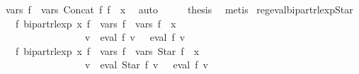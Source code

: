\begin{isabellebody}
\ {\isachardoublequoteopen}vars\ {\isacharquery}{\kern0pt}f{\isacharprime}{\kern0pt}\ {\isacharequal}{\kern0pt}\ vars\ {\isacharparenleft}{\kern0pt}Concat\ f{}\ f{}{\isacharparenright}{\kern0pt}\ {\isasymunion}\ {\isacharbraceleft}{\kern0pt}x{\isacharbraceright}{\kern0pt}{\isachardoublequoteclose}\ \isamarkupfalse%
\ auto\isanewline
\ \ \isamarkupfalse%
\ \isamarkupfalse%
\ {\isacharquery}{\kern0pt}thesis\ \isamarkupfalse%
\ metis\isanewline
{}\isamarkupfalse%
%
\endisatagproof
{\isafoldproof}%
%
\isadelimproof
\isanewline
%
\endisadelimproof
\isanewline
{}\isamarkupfalse%
\ reg{\isacharunderscore}{\kern0pt}eval{\isacharunderscore}{\kern0pt}bipart{\isacharunderscore}{\kern0pt}rlexp{\isacharunderscore}{\kern0pt}Star{\isacharcolon}{\kern0pt}\isanewline
\ \ \ {\isachardoublequoteopen}{\isasymexists}f{\isacharprime}{\kern0pt}{\isachardot}{\kern0pt}\ bipart{\isacharunderscore}{\kern0pt}rlexp\ x\ f{\isacharprime}{\kern0pt}\ {\isasymand}\ vars\ f{\isacharprime}{\kern0pt}\ {\isacharequal}{\kern0pt}\ vars\ f\ {\isasymunion}\ {\isacharbraceleft}{\kern0pt}x{\isacharbraceright}{\kern0pt}\isanewline
\ \ \ \ \ \ \ \ \ \ \ \ \ \ \ \ {\isasymand}\ {\isacharparenleft}{\kern0pt}{\isasymforall}v{\isachardot}{\kern0pt}\ {\isasymPsi}\ {\isacharparenleft}{\kern0pt}eval\ f\ v{\isacharparenright}{\kern0pt}\ {\isacharequal}{\kern0pt}\ {\isasymPsi}\ {\isacharparenleft}{\kern0pt}eval\ f{\isacharprime}{\kern0pt}\ v{\isacharparenright}{\kern0pt}{\isacharparenright}{\kern0pt}{\isachardoublequoteclose}\isanewline
\ \ \ {\isachardoublequoteopen}{\isasymexists}f{\isacharprime}{\kern0pt}{\isachardot}{\kern0pt}\ bipart{\isacharunderscore}{\kern0pt}rlexp\ x\ f{\isacharprime}{\kern0pt}\ {\isasymand}\ vars\ f{\isacharprime}{\kern0pt}\ {\isacharequal}{\kern0pt}\ vars\ {\isacharparenleft}{\kern0pt}Star\ f{\isacharparenright}{\kern0pt}\ {\isasymunion}\ {\isacharbraceleft}{\kern0pt}x{\isacharbraceright}{\kern0pt}\isanewline
\ \ \ \ \ \ \ \ \ \ \ \ \ \ \ \ {\isasymand}\ {\isacharparenleft}{\kern0pt}{\isasymforall}v{\isachardot}{\kern0pt}\ {\isasymPsi}\ {\isacharparenleft}{\kern0pt}eval\ {\isacharparenleft}{\kern0pt}Star\ f{\isacharparenright}{\kern0pt}\ v{\isacharparenright}{\kern0pt}\ {\isacharequal}{\kern0pt}\ {\isasymPsi}\ {\isacharparenleft}{\kern0pt}eval\ f{\isacharprime}{\kern0pt}\ v{\isacharparenright}{\kern0pt}{\isacharparenright}{\kern0pt}{\isachardoublequoteclose}\isanewline
%
\isadelimproof
%
\endisadelimproof

\end{isabellebody}
